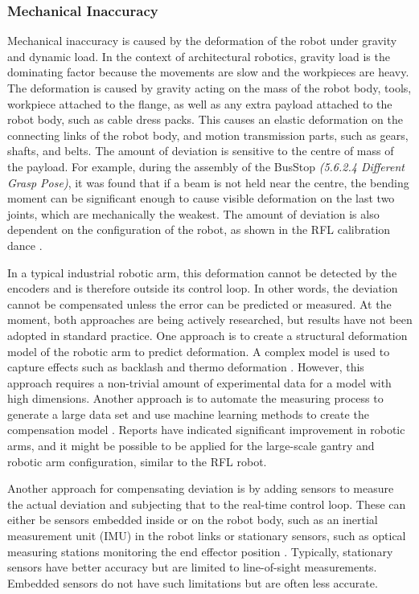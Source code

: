 \subsubsection{Mechanical Inaccuracy}
\label{subsubsection:new-hypo-mechanical-inaccuracy}

Mechanical inaccuracy is caused by the deformation of the robot under gravity and dynamic load. In the context of architectural robotics, gravity load is the dominating factor because the movements are slow and the workpieces are heavy. The deformation is caused by gravity acting on the mass of the robot body, tools, workpiece attached to the flange, as well as any extra payload attached to the robot body, such as cable dress packs. This causes an elastic deformation on the connecting links of the robot body, and motion transmission parts, such as gears, shafts, and belts. The amount of deviation is sensitive to the centre of mass of the payload. For example, during the assembly of the BusStop\textit{ (5.6.2.4 Different Grasp Pose)}, it was found that if a beam is not held near the centre, the bending moment can be significant enough to cause visible deformation on the last two joints, which are mechanically the weakest. The amount of deviation is also dependent on the configuration of the robot, as shown in the RFL calibration dance .

In a typical industrial robotic arm, this deformation cannot be detected by the encoders and is therefore outside its control loop. In other words, the deviation cannot be compensated unless the error can be predicted or measured. At the moment, both approaches are being actively researched, but results have not been adopted in standard practice. One approach is to create a structural deformation model of the robotic arm to predict deformation. A complex model is used to capture effects such as backlash and thermo deformation \parencite{wuReviewIndustrialRobot2022}. However, this approach requires a non-trivial amount of experimental data for a model with high dimensions. Another approach is to automate the measuring process to generate a large data set and use machine learning methods to create the compensation model \parencite{yeHighaccuracyPredictionCompensation2022}. Reports have indicated significant improvement in robotic arms, and it might be possible to be applied for the large-scale gantry and robotic arm configuration, similar to the RFL robot.

Another approach for compensating deviation is by adding sensors to measure the actual deviation and subjecting that to the real-time control loop. These can either be sensors embedded inside or on the robot body, such as an inertial measurement unit (IMU) in the robot links \parencite{judHEAPAutonomousWalking2021} or stationary sensors, such as optical measuring stations monitoring the end effector position \parencite{stadelmannEndEffectorPoseCorrection2019}. Typically, stationary sensors have better accuracy but are limited to line-of-sight measurements. Embedded sensors do not have such limitations but are often less accurate. 

